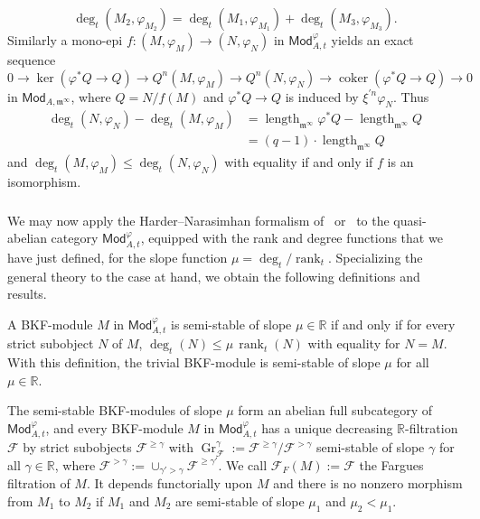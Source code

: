 \documentclass[11pt]{article}
\theoremstyle{definition}
\numberwithin{equation}{section}
\numberwithin{figure}{section}
\numberwithin{table}{section}
\newcommand{\Mod}{\mathsf{Mod}}
\DeclareMathOperator{\coker}{coker}
\DeclareMathOperator{\length}{length}
\DeclareMathOperator{\rank}{rank}
\DeclareMathOperator{\Gr}{Gr}
\begin{document}
\[
\deg_{t}(M_{2},\varphi_{M_{2}})=\deg_{t}(M_{1},\varphi_{M_{1}})+\deg_{t}(M_{3},\varphi_{M_{3}}).
\]
Similarly a mono-epi $f:(M,\varphi_{M})\rightarrow(N,\varphi_{N})$ in $\Mod_{A,t}^{\varphi}$ yields an exact sequence
\[
0\rightarrow\ker(\varphi^{\ast}Q\rightarrow Q)\rightarrow Q^{n}(M,\varphi_{M})\rightarrow Q^{n}(N,\varphi_{N})\rightarrow\coker(\varphi^{\ast}Q\rightarrow Q)\rightarrow0
\]
in $\Mod_{A,\mathfrak{m}^{\infty}}$, where $Q=N/f(M)$ and $\varphi^{\ast}Q\rightarrow Q$ is induced by $\xi^{\prime n}\varphi_{N}$. Thus
\begin{align*}
\deg_{t}(N,\varphi_{N})-\deg_{t}(M,\varphi_{M}) & = \length_{\mathfrak{m}^{\infty}}\varphi^{\ast}Q-\length_{\mathfrak{m}^{\infty}}Q\\
& = (q-1)\cdot\length_{\mathfrak{m}^{\infty}}Q
\end{align*}
and $\deg_{t}(M,\varphi_{M})\leq\deg_{t}(N,\varphi_{N})$ with equality if and only if $f$ is an isomorphism.

\subsubsection{}

We may now apply the Harder--Narasimhan formalism of~\cite{An09} or~\cite{Co16} to the quasi-abelian category $\Mod_{A,t}^{\varphi}$, equipped with the rank and degree functions that we have just defined, for the slope function $\mu=\deg_{t}/\rank_{t}$. Specializing the general theory to the case at hand, we obtain the following definitions and results.

A BKF-module $M$ in $\Mod_{A,t}^{\varphi}$ is semi-stable of slope $\mu\in\mathbb{R}$ if and only if for every strict subobject $N$ of $M$, $\deg_{t}(N)\leq\mu\,\rank_{t}(N)$ with equality for $N=M$. With this definition, the trivial BKF-module is semi-stable of slope $\mu$ for all $\mu\in\mathbb{R}$.

The semi-stable BKF-modules of slope $\mu$ form an abelian full subcategory of $\Mod_{A,t}^{\varphi}$, and every BKF-module $M$ in $\Mod_{A,t}^{\varphi}$ has a unique decreasing $\mathbb{R}$-filtration $\mathcal{F}$ by strict subobjects $\mathcal{F}^{\geq\gamma}$ with $\Gr_{\mathcal{F}}^{\gamma}:=\mathcal{F}^{\geq\gamma}/\mathcal{F}^{>\gamma}$ semi-stable of slope $\gamma$ for all $\gamma\in\mathbb{R}$, where $\mathcal{F}^{>\gamma}:=\cup_{\gamma'>\gamma}\mathcal{F}^{\geq\gamma'}$. We call $\mathcal{F}_{F}(M):=\mathcal{F}$ the Fargues filtration of $M$. It depends functorially upon $M$ and there is no nonzero morphism from $M_{1}$ to $M_{2}$ if $M_{1}$ and $M_{2}$ are semi-stable of slope $\mu_{1}$ and $\mu_{2}<\mu_{1}$.
\end{document}
